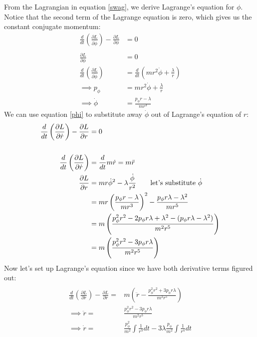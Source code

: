 \documentclass{report}
\begin{document}
From the Lagrangian in equation \ref{swag}, we derive Lagrange\rq{}s equation for $\phi$.
Notice that the second term of the Lagrange equation is zero, which gives us the constant conjugate momentum:
\begin{align}
\frac{d}{d t} \left(\frac{\partial L}{\partial \dot\phi}   \right) - \frac{\partial L}{\partial \phi} &= 0 \nonumber\\
\nonumber\\
\frac{\partial L}{\partial \phi} &= 0\\
\frac{d}{d t} \left(\frac{\partial L}{\partial \dot\phi}   \right) &=\frac{d}{d t}\left(mr^2\dot\phi + \frac{\lambda}{r} \right)\\
\implies p_\phi &= mr^2\dot\phi + \frac{\lambda}{r}\\
\implies \dot\phi &= \frac{p_\phi r - \lambda}{mr^3}\label{phi}
\end{align}
We can use equation \ref{phi} to substitute away $\dot\phi$ out of Lagrange\rq{}s equation of $r$:
\begin{align}
\frac{d}{d t} \left(\frac{\partial L}{\partial \dot r}   \right) - \frac{\partial L}{\partial r} &= 0 \nonumber\\
\nonumber\\
\frac{d}{d t} \left(\frac{\partial L}{\partial \dot r}   \right) &= \frac{d}{d t}m\dot r = m\ddot r \\
\frac{\partial L}{\partial r} &= mr\dot \phi^2 - \lambda \frac{\dot\phi}{r^2} \ \ \ \ \ \text{     let\rq{}s substitute } \dot\phi \nonumber\\
&= mr\left(\frac{p_\phi r - \lambda}{mr^3}\right)^2 -  \frac{p_\phi r\lambda - \lambda^2}{mr^5} \nonumber \\
&= m\left(\frac{p_\phi^2 r^2 -2p_\phi r \lambda   +\lambda^2-(p_\phi r\lambda - \lambda^2)}{m^2r^5} \right) \nonumber \\
&= m\left(\frac{p_\phi^2 r^2 -3p_\phi r \lambda  }{m^2r^5} \right) \nonumber
\end{align}
Now let\rq{}s set up Lagrange\rq{}s equation since we have both derivative terms figured out:
\begin{align}
\nonumber\\
\frac{d}{d t} \left(\frac{\partial L}{\partial \dot r}   \right) - \frac{\partial L}{\partial r} =& m\left(\ddot r - \frac{p_\phi^2 r^2 +3p_\phi r \lambda  }{m^2r^5}   \right)  \\
\implies  \ddot r =& \frac{p_\phi^2 r^2 - 3p_\phi r \lambda  }{m^2r^5} \\
\implies  \dot r =& \frac{p_\phi^2}{m^2} \int \frac{1}{r^3}dt   - 3\lambda\frac{p_\phi}{m^2}\int \frac{1}{r^4} dt \label{swag2}
\end{align}
\end{document}
